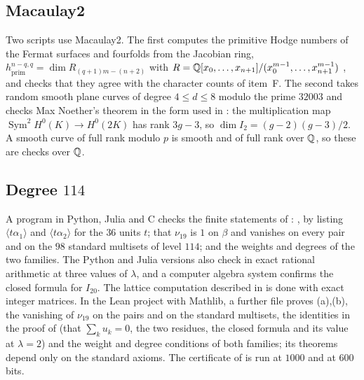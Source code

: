 \subsection*{Macaulay2}
Two scripts use Macaulay2. The first computes the primitive Hodge numbers of
the Fermat surfaces and fourfolds from the Jacobian ring,
$h^{n-q,q}_{\mathrm{prim}}=\dim R_{(q+1)m-(n+2)}$ with
$R=\mathbb{Q}[x_{0},\dots,x_{n+1}]/(x_{0}^{m-1},\dots,x_{n+1}^{m-1})$
\cite{Gri69}, and checks that they agree with the character counts of
item~F. The second takes random smooth plane curves of degree $4\le d\le8$
modulo the prime $32003$ and checks Max Noether's theorem in the form used in
: the multiplication map
$\operatorname{Sym}^{2}H^{0}(K)\to H^{0}(2K)$ has rank $3g-3$, so
$\dim I_{2}=(g-2)(g-3)/2$. A smooth curve of full rank modulo $p$ is smooth
and of full rank over $\mathbb{Q}$, so these are checks over $\mathbb{Q}$.

\subsection*{Degree \texorpdfstring{$114$}{114}}
A program in Python, Julia and C checks the finite statements of
: , by listing $\langle t\alpha_{1}
\rangle$ and $\langle t\alpha_{2}\rangle$ for the $36$ units $t$; that
$\nu_{19}$ is $1$ on $\beta$ and vanishes on every pair and on the $98$
standard multisets of level $114$; and the weights and degrees of the two
families. The Python and Julia versions also check  in
exact rational arithmetic at three values of $\lambda$, and a computer
algebra system confirms the closed formula for $I_{20}$. The lattice
computation described in  is done with exact integer
matrices. In the Lean project with Mathlib, a further file proves
(a),(b), the vanishing of $\nu_{19}$ on the pairs and on
the standard multisets, the identities in the proof of 
(that $\sum_{k}u_{k}=0$, the two residues, the closed formula and its value
at $\lambda=2$) and the weight and degree conditions of both families; its
theorems depend only on the standard axioms. The certificate of
 is run at $1000$ and at $600$ bits.

